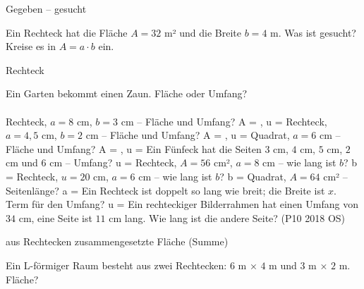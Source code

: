 \setcounter{aufgabe}{9}

\begin{aufgabe}{Gegeben – gesucht}
\begin{teile}
\teil Ein Rechteck hat die Fläche $A = 32$ m² und die Breite $b = 4$ m. Was ist gesucht? Kreise es in $A = a \cdot b$ ein.
\end{teile}
\end{aufgabe}

\begin{aufgabe}{Rechteck}
\begin{teile}
\teil Ein Garten bekommt einen Zaun. Fläche oder Umfang? \\  \\ 
\teil Rechteck, $a = 8$ cm, $b = 3$ cm – Fläche und Umfang? A = \leerfeld[cm²] , u = \leerfeld[cm]
\teil Rechteck, $a = 4{,}5$ cm, $b = 2$ cm – Fläche und Umfang? A = \leerfeld[cm²] , u = \leerfeld[cm]
\teil Quadrat, $a = 6$ cm – Fläche und Umfang? A = \leerfeld[cm²] , u = \leerfeld[cm]
\teil Ein Fünfeck hat die Seiten $3$ cm, $4$ cm, $5$ cm, $2$ cm und $6$ cm – Umfang? u = \leerfeld[cm]
\teil Rechteck, $A = 56$ cm², $a = 8$ cm – wie lang ist $b$? b = \leerfeld[cm]
\teil Rechteck, $u = 20$ cm, $a = 6$ cm – wie lang ist $b$? b = \leerfeld[cm]
\teil Quadrat, $A = 64$ cm² – Seitenlänge? a = \leerfeld[cm]
\teil Ein Rechteck ist doppelt so lang wie breit; die Breite ist $x$. Term für den Umfang? u = \leerfeld
\teil Ein rechteckiger Bilderrahmen hat einen Umfang von $34$ cm, eine Seite ist $11$ cm lang. Wie lang ist die andere Seite? \hfill (P10 2018 OS) \\ \leerfeld[cm]
\end{teile}
\end{aufgabe}

\begin{aufgabe}{aus Rechtecken zusammengesetzte Fläche (Summe)}
\begin{teile}
\teil Ein L-förmiger Raum besteht aus zwei Rechtecken: $6$ m × $4$ m und $3$ m × $2$ m. Fläche? \leerfeld[m²]
\end{teile}
\end{aufgabe}

